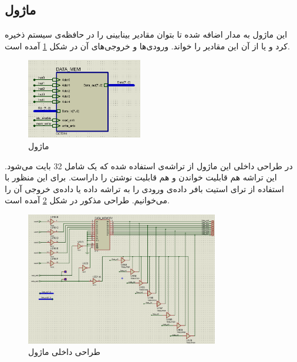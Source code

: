 \documentclass[12pt,onecolumn,a4paper,fleqn]{article}
\begin{document}
	\subsection{ماژول }
	این ماژول به مدار اضافه شده تا بتوان مقادیر بینابینی را در حافظه‌ی سیستم ذخیره کرد و یا از آن این مقادیر را خواند. ورودی‌ها و خروجی‌های آن در شکل \ref{fig:datamem} آمده است.
	\begin{figure}[H]
		\centering
		\includegraphics[width=0.45\textwidth]{source/datamem_interface.png}
		\caption{ماژول }
		\label{fig:datamem}
	\end{figure}
	در طراحی داخلی این ماژول از تراشه‌ی  استفاده شده که یک  شامل 32 بایت می‌شود. این تراشه هم قابلیت خواندن و هم قابلیت نوشتن را داراست. برای این منظور با استفاده از ترای استیت بافر داده‌ی ورودی را به تراشه داده یا داده‌ی خروجی آن را می‌خوانیم. طراحی مذکور در شکل \ref{fig:datamem_inner} آمده است.
	\begin{figure}[H]
		\centering
		\includegraphics[width=0.75\textwidth]{source/datamem_inner.png}
		\caption{طراحی داخلی ماژول }
		\label{fig:datamem_inner}
	\end{figure}
	
\end{document}

